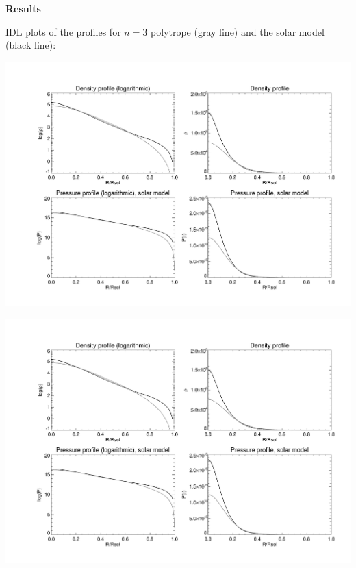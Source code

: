 \documentclass[a4paper,12pt]{article}
\begin{document}
\begin{itemize}
\vspace{0.5cm}
\textbf{Results}


IDL plots of the profiles for $n=3$ polytrope (gray line) and the solar model (black line):

\centerline{\includegraphics[scale=0.6,page=1]{compare2.pdf}}

\centerline{\includegraphics[scale=0.6,page=2]{compare2.pdf}}




\end{itemize}
\end{document}
